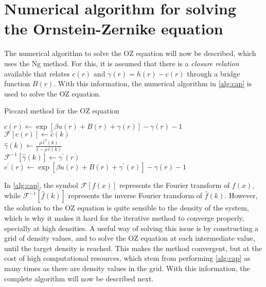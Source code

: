 \section{Numerical algorithm for solving the Ornstein-Zernike equation}
The numerical algorithm to solve the OZ equation will now be described, which uses the Ng 
method. For this, it is assumed that there is a \emph{closure relation} available that 
relates \(c(r)\) and \(\gamma(r) = h(r) - c(r)\) through a bridge function \(B(r)\). With 
this information, the numerical algorithm in \autoref{alg:cap} is used to solve the OZ equation.
\begin{algorithm}
    \caption{Piccard method for the OZ equation}\label{alg:cap}
    \begin{algorithmic}
        \State \(c(r) \gets \exp{\left[\beta u(r) + B(r) + \gamma(r)\right]} - \gamma(r) - 1\)  \\
        \State \(\mathcal{F} \left[c(r)\right] \gets \hat{c}(k)\) \\
        \State \(\hat{\gamma}(k) \gets \frac{\rho \, \hat{c}^{2}(k)}{1 - \rho \, \hat{c}(k)}\) \\
        \State \(\mathcal{F}^{-1} \left[\hat{\gamma}(k)\right] \gets \gamma^{\prime}(r)\) \\
        \State \(c^{\prime}(r) \gets \exp{\left[\beta u(r) + B(r) + \gamma^{\prime}(r)\right]} - \gamma(r) - 1\) 
    \end{algorithmic}
\end{algorithm}

In \autoref{alg:cap}, the symbol \(\mathcal{F} [f(x)]\) represents the Fourier transform of \(f(x)\), while \(\mathcal{F}^{-1} [\hat{f}(k)]\) represents the inverse Fourier transform of \(\hat{f}(k)\).
However, the solution to the OZ equation is quite sensible to the density of the system, 
which is why it makes it hard for the iterative method to converge properly, specially at 
high densities. A useful way of solving this issue is by constructing a grid of density 
values, and to solve the OZ equation at each intermediate value, until the target density 
is reached. This makes the method convergent, but at the cost of high computational 
resources, which stem from performing \autoref{alg:cap} as many times as there are density 
values in the grid. With this information, the complete algorithm will now be described 
next.


